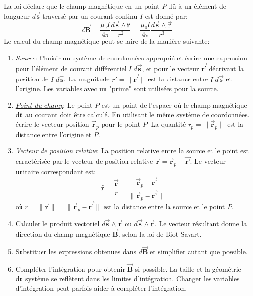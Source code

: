 \documentclass[a4paper]{article}
\begin{document}
La loi déclare que le champ magnétique en un point $ P $ dû à un élément de longueur $ d \vec{\textbf{s}} $ traversé par un courant continu $ I $ est donné par: 
\[ d \vec{\textbf{B}} = \frac{\mu_0 I}{4 \pi} \frac{d \vec{\textbf{s}} \wedge \hat{\textbf{r}}}{r^2} = \frac{\mu_0 I}{4 \pi} \frac{d \vec{\textbf{s}} \wedge \vec{\textbf{r}}}{r^3} \]
Le calcul du champ magnétique peut se faire de la manière suivante: 
\begin{enumerate}
    \item \emph{\underline{Source}}: Choisir un système de coordonnées approprié et écrire une expression pour l'élément de courant 
différentiel $ I \; d \vec{\textbf{s}} $, et pour le vecteur $ \overrightarrow{\textbf{r'}} $ décrivant la position de $ I \; d \vec{\textbf{s}} $. La magnitude $ r' = \| \overrightarrow{\textbf{r'}} \| $ est la distance entre $ I \; d \vec{\textbf{s}} $ et l'origine. Les variables avec un "prime" sont utilisées pour la source.
    \item \emph{\underline{Point du champ}}: Le point $ P $ est un point de l'espace où le champ magnétique dû au courant doit être 
calculé. En utilisant le même système de coordonnées, écrire le vecteur position $ \vec{\textbf{r}}_p $ pour le point $ P $. La quantité $ r_p = \| \vec{\textbf{r}}_p \| $ est la distance entre l'origine et $ P $.
    \item \emph{\underline{Vecteur de position relative}}: La position relative entre la source et le point est caractérisée par le 
vecteur de position relative $ \vec{\textbf{r}} = \vec{\textbf{r}}_p - \overrightarrow{\textbf{r'}} $. Le vecteur unitaire correspondant est: 
\[ \hat{\textbf{r}} = \frac{\vec{\textbf{r}}}{r} = \frac{\vec{\textbf{r}}_p - \overrightarrow{\textbf{r'}}}{\| \vec{\textbf{r}}_p - \overrightarrow{\textbf{r'}} \|} \]
où $ r = \| \vec{\textbf{r}} \| = \| \vec{\textbf{r}}_p - \overrightarrow{\textbf{r'}} \| $ est la distance entre la source et le point $ P $.
    \item Calculer le produit vectoriel $ d \vec{\textbf{s}} \wedge \overrightarrow{\textbf{r}} $ ou $ d \vec{\textbf{s}} \wedge 
\vec{\textbf{r}} $. Le vecteur résultant donne la direction du champ magnétique $ \vec{\textbf{B}} $, selon la loi de Biot-Savart.
    \item Substituer les expressions obtenues dans $ d \vec{\textbf{B}} $ et simplifier autant que possible.
    \item Compléter l'intégration pour obtenir $ \vec{\textbf{B}} $ si possible. La taille et la géométrie du système se reflètent dans 
les limites d'intégration. Changer les variables d'intégration peut parfois aider à compléter l'intégration.
\end{enumerate}
\end{document}
